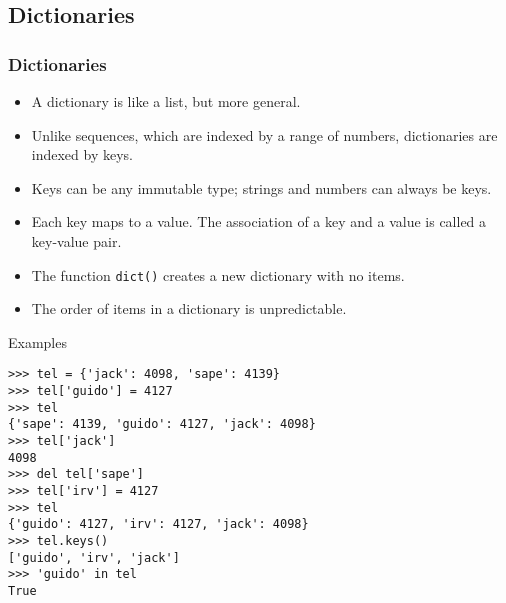 \documentclass{beamer}
\newcommand{\beforeverb}{\footnotesize}
\newcommand{\afterverb}{\normalsize}
\begin{document}
\subsection[Dictionaries]{Dictionaries}
\begin{frame}[fragile]

\frametitle{Dictionaries}
\begin{itemize}
\item A \alert{dictionary} is like a list, but more general.  
\item Unlike sequences, which are indexed by a range of numbers, dictionaries are indexed by \alert{keys}.
\item Keys can be any \alert{immutable type}; strings and numbers can always be keys.
\item Each key maps to a value.  The association of a key and a value is called a \alert{key-value pair}.
\item The function {\tt dict()} creates a new dictionary with no items.
\item The order of items in a dictionary is \alert{unpredictable}.

\end{itemize}


\end{frame}
\begin{frame}[fragile]

\begin{block}{Examples}
\beforeverb
\begin{verbatim}
>>> tel = {'jack': 4098, 'sape': 4139} 
>>> tel['guido'] = 4127 
>>> tel 
{'sape': 4139, 'guido': 4127, 'jack': 4098} 
>>> tel['jack']
4098
>>> del tel['sape'] 
>>> tel['irv'] = 4127 
>>> tel 
{'guido': 4127, 'irv': 4127, 'jack': 4098} 
>>> tel.keys() 
['guido', 'irv', 'jack'] 
>>> 'guido' in tel 
True
\end{verbatim}
\afterverb
\end{block}

\end{frame}
\end{document}
